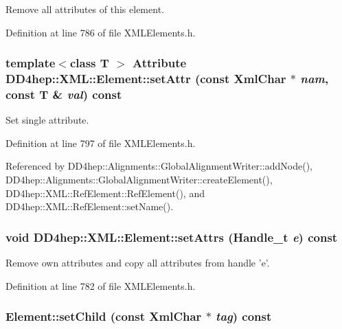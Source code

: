 Remove all attributes of this element. 

Definition at line 786 of file XMLElements.h.\hypertarget{class_d_d4hep_1_1_x_m_l_1_1_element_a5c24c61084c01b0e23a9c56c13f1498c}{
\subsubsection[{setAttr}]{\setlength{\rightskip}{0pt plus 5cm}template$<$class T $>$ {\bf Attribute} DD4hep::XML::Element::setAttr (const {\bf XmlChar} $\ast$ {\em nam}, \/  const {\bf T} \& {\em val}) const}}
\label{class_d_d4hep_1_1_x_m_l_1_1_element_a5c24c61084c01b0e23a9c56c13f1498c}


Set single attribute. 

Definition at line 797 of file XMLElements.h.

Referenced by DD4hep::Alignments::GlobalAlignmentWriter::addNode(), DD4hep::Alignments::GlobalAlignmentWriter::createElement(), DD4hep::XML::RefElement::RefElement(), and DD4hep::XML::RefElement::setName().\hypertarget{class_d_d4hep_1_1_x_m_l_1_1_element_ac383b5cad9e06224a243d899c3a8c100}{
\subsubsection[{setAttrs}]{\setlength{\rightskip}{0pt plus 5cm}void DD4hep::XML::Element::setAttrs ({\bf Handle\_\-t} {\em e}) const}}
\label{class_d_d4hep_1_1_x_m_l_1_1_element_ac383b5cad9e06224a243d899c3a8c100}


Remove own attributes and copy all attributes from handle 'e'. 

Definition at line 782 of file XMLElements.h.\hypertarget{class_d_d4hep_1_1_x_m_l_1_1_element_ad21b7661b1923c0d845c784dc8f8979b}{
\subsubsection[{setChild}]{ Element::setChild (const {\bf XmlChar} $\ast$ {\em tag}) const}}
\label{class_d_d4hep_1_1_x_m_l_1_1_element_ad21b7661b1923c0d845c784dc8f8979b}



